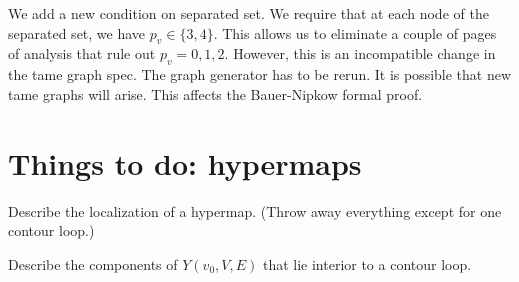 We add a new condition on separated set.  We require that 
at each node of the separated set, we have $p_v\in\{3,4\}$.
This allows us to eliminate a couple of pages of analysis
that rule out $p_v=0,1,2$.  However, this is an incompatible
change in the tame graph spec.  The graph generator has to
be rerun.  It is possible that new tame graphs will arise.
This affects the Bauer-Nipkow formal proof.

\section{Things to do: hypermaps}

Describe the localization of a hypermap.  (Throw away everything
except for one contour loop.)

Describe the components of $Y(v_0,V,E)$ that lie interior to
a contour loop.  



